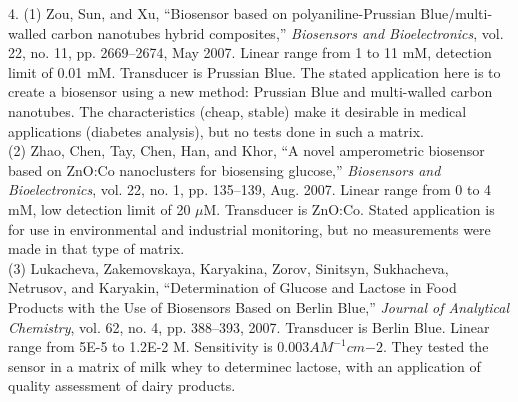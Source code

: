 \documentclass{article}
\begin{document}
4. (1) Zou, Sun, and Xu, ``Biosensor based on polyaniline-Prussian Blue/multi-walled carbon nanotubes hybrid composites,'' \textit{Biosensors and Bioelectronics}, vol. 22, no. 11, pp. 2669--2674, May 2007. Linear range from 1 to 11 mM, detection limit of 0.01 mM. Transducer is Prussian Blue. The stated application here is to create a biosensor using a new method: Prussian Blue and multi-walled carbon nanotubes. The characteristics (cheap, stable) make it desirable in medical applications (diabetes analysis), but no tests done in such a matrix. \\
(2) Zhao, Chen, Tay, Chen, Han, and Khor, ``A novel amperometric biosensor based on ZnO:Co nanoclusters for biosensing glucose,'' \textit{Biosensors and Bioelectronics}, vol. 22, no. 1, pp. 135--139, Aug. 2007. Linear range from 0 to 4 mM, low detection limit of 20 $\mu$M. Transducer is ZnO:Co. Stated application is for use in environmental and industrial monitoring, but no measurements were made in that type of matrix. \\
(3) Lukacheva, Zakemovskaya, Karyakina, Zorov, Sinitsyn, Sukhacheva, Netrusov, and Karyakin, ``Determination of Glucose and Lactose in Food Products with the Use of Biosensors Based on Berlin Blue,'' \textit{Journal of Analytical Chemistry}, vol. 62, no. 4, pp. 388--393, 2007. Transducer is Berlin Blue.  Linear range from 5E-5 to 1.2E-2 M. Sensitivity is 0.003$AM^{-1}cm{-2}$. They tested the sensor in a matrix of milk whey to determinec lactose, with an application of quality assessment of dairy products. \\
\end{document}
